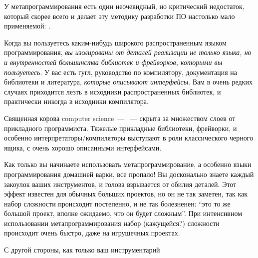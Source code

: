 \label{whitebox}

У метапрограммирования есть один неочевидный, но критический недостаток, который
скорее всего и делает эту методику разработки ПО настолько мало применяемой: .

Когда вы пользуетесь каким-нибудь широкого распространенным языком
программирования, \emph{вы изолированы от деталей реализации не только языка, но
и внутренностей большинства библиотек и фрейворков, которыми вы пользуетесь}. У
вас есть гугл, руководство по компилятору, документация на библиотеки и
литература, \textit{которые описывают интерфейсы}. Вам в очень редких случаях
приходится лезть в исходники распространенных библиотек, и практически никогда в
исходники компилятора.

\bigskip
Священная корова computer science\ --- \ ---
скрыта за множеством слоев от прикладного программиста. Тяжелые прикладные
библиотеки, фрейворки, и особенно интерпретаторы/компиляторы выступают в роли
классического черного ящика, с очень хорошо описанными интерфейсами.

\bigskip
Как только вы начинаете использовать метапрограммирование, а особенно языки
программирования домашней варки, все пропало! Вы досконально знаете каждый
закоулок ваших инструментов, и голова взрывается от обилия деталей. Этот эффект
известен для обычных больших проектов, но он не так заметен, так как набор
сложности происходит постепенно, и не так болезненен: ``это то же большой
проект, вполне ожидаемо, что он будет сложным''. При интенсивном использовании
метапрограммирования набор (кажущейся?) сложности происходит очень быстро, даже
на игрушечных проектах.

\bigskip
С другой стороны, как только ваш инструментарий

